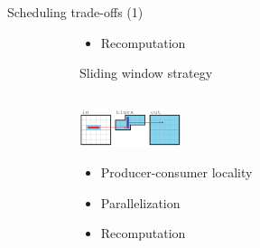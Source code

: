 \documentclass[8pt,a4paper,oneside,hidelinks,aspectratio=169,dvipsnames]{beamer}
\newcommand{\cmark}{\ding{51}\xspace}%
\newcommand{\xmark}{\ding{55}\xspace}%
\begin{document}
\begin{frame}[fragile]{Scheduling trade-offs (1)}
\begin{figure}[H]
{\begin{minipage}{1.2\textwidth}
\begin{subfigure}[H]{.31\textwidth}
\begin{itemize}
            \item[\xmark\xmark] Recomputation
          \end{itemize}
        \end{subfigure}
        \begin{subfigure}[H]{.3475\textwidth}
          \centering
          Sliding window strategy
          \inputminted[tabsize=2,frame=single,rulecolor=gray,fontsize=\fontsize{4.2}{3}]{cpp}{fig/blur_3x3_sliding_window.cpp}
          \centering
          \includegraphics[width=3cm]{img/halide-sliding-window.png}
          \begin{itemize}
            \item[\cmark] Producer-consumer locality
            \item[\xmark\xmark] Parallelization
            \item[\cmark\cmark] Recomputation
          \end{itemize}
        \end{subfigure}
      \end{minipage}
    }
    \centering
    \unskip
    \vspace{0.3cm}
  \end{figure}
\end{frame}
\end{document}
